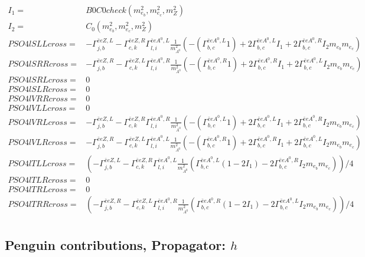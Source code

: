 \documentclass[A4,landscape]{article}
\begin{document}
\begin{align} 
I_1= & B0C0check(m^2_{e_{{b}}}, m^2_{e_{{c}}}, m^2_{Z}) \\ 
I_2= & C_0(m^2_{e_{{b}}}, m^2_{e_{{c}}}, m^2_{Z}) \\ 
  PSO4lSLLcross= &  - \Gamma^{\bar{e}e Z ,L} _{j, b} - \Gamma^{\bar{e}e Z ,R} _{c, k} \Gamma^{\bar{e}e A^0 ,L}_{l, i} \frac{1}{m^2_{A^0}} (-(\Gamma^{\bar{e}e A^0 ,L}_{b, c} 1) + 2 \Gamma^{\bar{e}e A^0 ,L}_{b, c} I_1 + 2 \Gamma^{\bar{e}e A^0 ,R}_{b, c} I_2 m_{e_{{b}}} m_{e_{{c}}}) \\ 
  PSO4lSRRcross= &  - \Gamma^{\bar{e}e Z ,R} _{j, b} - \Gamma^{\bar{e}e Z ,L} _{c, k} \Gamma^{\bar{e}e A^0 ,R}_{l, i} \frac{1}{m^2_{A^0}} (-(\Gamma^{\bar{e}e A^0 ,R}_{b, c} 1) + 2 \Gamma^{\bar{e}e A^0 ,R}_{b, c} I_1 + 2 \Gamma^{\bar{e}e A^0 ,L}_{b, c} I_2 m_{e_{{b}}} m_{e_{{c}}}) \\ 
  PSO4lSRLcross= & 0 \\ 
  PSO4lSLRcross= & 0 \\ 
  PSO4lVRRcross= & 0 \\ 
  PSO4lVLLcross= & 0 \\ 
  PSO4lVRLcross= &  - \Gamma^{\bar{e}e Z ,L} _{j, b} - \Gamma^{\bar{e}e Z ,R} _{c, k} \Gamma^{\bar{e}e A^0 ,R}_{l, i} \frac{1}{m^2_{A^0}} (-(\Gamma^{\bar{e}e A^0 ,L}_{b, c} 1) + 2 \Gamma^{\bar{e}e A^0 ,L}_{b, c} I_1 + 2 \Gamma^{\bar{e}e A^0 ,R}_{b, c} I_2 m_{e_{{b}}} m_{e_{{c}}}) \\ 
  PSO4lVLRcross= &  - \Gamma^{\bar{e}e Z ,R} _{j, b} - \Gamma^{\bar{e}e Z ,L} _{c, k} \Gamma^{\bar{e}e A^0 ,L}_{l, i} \frac{1}{m^2_{A^0}} (-(\Gamma^{\bar{e}e A^0 ,R}_{b, c} 1) + 2 \Gamma^{\bar{e}e A^0 ,R}_{b, c} I_1 + 2 \Gamma^{\bar{e}e A^0 ,L}_{b, c} I_2 m_{e_{{b}}} m_{e_{{c}}}) \\ 
  PSO4lTLLcross= & ( - \Gamma^{\bar{e}e Z ,L} _{j, b} - \Gamma^{\bar{e}e Z ,R} _{c, k} \Gamma^{\bar{e}e A^0 ,L}_{l, i} \frac{1}{m^2_{A^0}} (\Gamma^{\bar{e}e A^0 ,L}_{b, c} (1 - 2 I_1) - 2 \Gamma^{\bar{e}e A^0 ,R}_{b, c} I_2 m_{e_{{b}}} m_{e_{{c}}}))/4 \\ 
  PSO4lTLRcross= & 0 \\ 
  PSO4lTRLcross= & 0 \\ 
  PSO4lTRRcross= & ( - \Gamma^{\bar{e}e Z ,R} _{j, b} - \Gamma^{\bar{e}e Z ,L} _{c, k} \Gamma^{\bar{e}e A^0 ,R}_{l, i} \frac{1}{m^2_{A^0}} (\Gamma^{\bar{e}e A^0 ,R}_{b, c} (1 - 2 I_1) - 2 \Gamma^{\bar{e}e A^0 ,L}_{b, c} I_2 m_{e_{{b}}} m_{e_{{c}}}))/4 \\ 
\end{align} 
\subsection{Penguin contributions, Propagator: $h$} 
\end{document}
